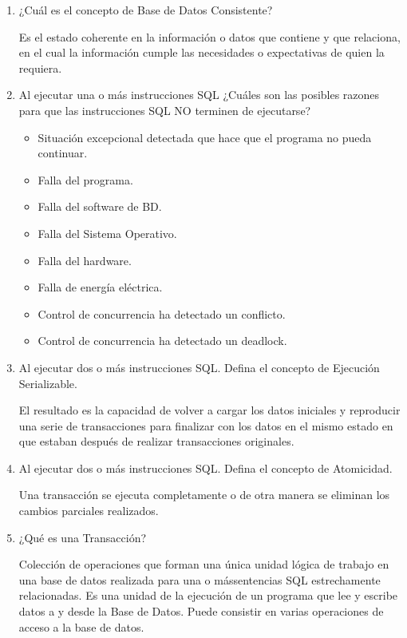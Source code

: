 \begin{enumerate}
\item ¿Cuál es el concepto de Base de Datos Consistente?

Es el estado coherente en la información o datos que contiene y que relaciona, en el cual la información cumple las necesidades o expectativas de quien la requiera. 

\item Al ejecutar una o más instrucciones SQL ¿Cuáles son las posibles razones para que las instrucciones SQL NO terminen de ejecutarse?

\begin{itemize}
\item Situación excepcional detectada que hace que el programa no pueda continuar.
\item Falla del programa.
\item Falla del software de BD.
\item Falla del Sistema Operativo.
\item Falla del hardware.
\item Falla de energía eléctrica.
\item Control de concurrencia ha detectado un conflicto.
\item Control de concurrencia ha detectado un deadlock.
\end{itemize}
       

\item Al ejecutar dos o más instrucciones SQL. Defina el concepto de Ejecución Serializable.

El resultado es la capacidad de volver a cargar los datos iniciales y reproducir una serie de transacciones para finalizar con los datos en el mismo estado en que estaban después de realizar transacciones originales. 

\item Al ejecutar dos o más instrucciones SQL. Defina el concepto de Atomicidad.

Una transacción se ejecuta completamente o de otra manera se eliminan los cambios parciales realizados.

\item ¿Qué es una Transacción?

Colección de operaciones que forman una única unidad lógica de trabajo en una base de datos realizada para una o mássentencias SQL estrechamente relacionadas. Es una unidad de la ejecución de un programa que lee y escribe datos a y desde la Base de Datos. Puede consistir en varias operaciones de acceso a la base de datos.


\end{enumerate}
